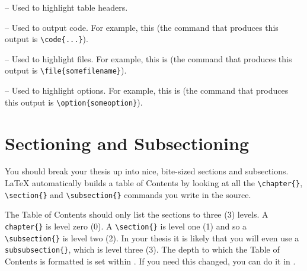  -- Used to highlight table headers. 

 -- Used to output code. For example, this  (the command that produces this output is \verb|\code{...}|).

 -- Used to highlight files. For example, this is  (the command that produces this output is \verb|\file{somefilename}|).

 -- Used to highlight options. For example, this is  (the command that produces this output is \verb|\option{someoption}|).


\section{Sectioning and Subsectioning}

You should break your thesis up into nice, bite-sized sections and subsections. \LaTeX{} automatically builds a table of Contents by looking at all the \verb|\chapter{}|, \verb|\section{}|  and \verb|\subsection{}| commands you write in the source.

The Table of Contents should only list the sections to three (3) levels. A \verb|chapter{}| is level zero (0). A \verb|\section{}| is level one (1) and so a \verb|\subsection{}| is level two (2). In your thesis it is likely that you will even use a \verb|subsubsection{}|, which is level three (3). The depth to which the Table of Contents is formatted is set within . If you need this changed, you can do it in .

